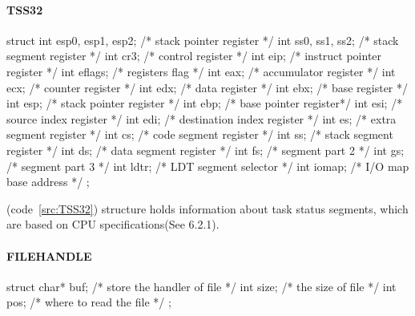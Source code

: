 \documentclass{swfcthesis}
\begin{document}
\paragraph{TSS32}

\begin{listing}[H]
  \begin{codeblock}
\begin{ccode}
struct 
{ 
  int esp0, esp1, esp2; /* stack pointer register */
  int ss0, ss1, ss2;    /* stack segment register */
  int cr3;              /* control register */
  int eip;              /* instruct pointer register */
  int eflags;           /* registers flag */
  int eax;              /* accumulator register */
  int ecx;              /* counter register */
  int edx;              /* data register */
  int ebx;              /* base register */
  int esp;              /* stack pointer register */
  int ebp;              /* base pointer register*/
  int esi;              /* source index register */
  int edi;              /* destination index register */
  int es;               /* extra segment register */
  int cs;               /* code segment register */
  int ss;               /* stack segment register */
  int ds;               /* data segment register */
  int fs;               /* segment part 2 */
  int gs;               /* segment part 3 */
  int ldtr;             /* LDT segment selector */
  int iomap;            /* I/O map base address */
};
\end{ccode}
  \end{codeblock}
  \caption{\emph{struct TSS32}}\label{src:TSS32}
\end{listing}

(code~\ref{src:TSS32}) structure holds information about task status segments, which are
based on CPU specifications(See 6.2.1\cite{intel_3a}).


\paragraph{FILEHANDLE}

\begin{listing}[H]
  \begin{codeblock}
\begin{ccode}
struct 
{ 
  char* buf; /* store the handler of file */
  int size;  /* the size of file */
  int pos;   /* where to read the file */
};
\end{ccode}
  \end{codeblock}
  \caption{\emph{struct FILEHANDLE}}\label{src:FILEHANDLE}
\end{listing}
\end{document}
